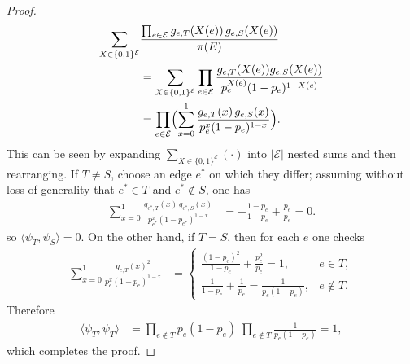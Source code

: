 \documentclass[10pt,a4paper]{amsart}
\begin{document}
\begin{proof}
\begin{align*}
            \sum_{X\in\{0,1\}^{\mathcal E}}&\frac{\prod_{e\in\mathcal{E}}g_{e,T}(X(e))\,g_{e,S}(X(e))}{\pi(E)}\\
            &=\sum_{X\in\{0,1\}^{\mathcal E}} \prod_{e\in\mathcal{E}} \frac{g_{e,T}(X(e)) g_{e,S}(X(e))}{p_e^{X(e)}(1-p_e)^{1-X(e)}}\\
            &=\prod_{e\in\mathcal E}
            \Bigl(\sum_{x=0}^1\frac{g_{e,T}(x)\,g_{e,S}(x)}{p_e^x(1-p_e)^{1-x}}\Bigr).
        \end{align*}
    This can be seen by expanding $\sum_{X\in\{0,1\}^{\mathcal E}}(\cdot)$ into $|\mathcal{E}|$ nested sums and then rearranging. If $T\neq S$, choose an edge $e^\ast$ on which they differ; assuming without loss of generality that $e^\ast\in T$ and $e^\ast\notin S$, one has
        \begin{align*}
            \sum_{x=0}^1\frac{g_{e^\ast,T}(x)\,g_{e^\ast,S}(x)}{p_{e^\ast}^x(1-p_{e^\ast})^{1-x}}
            &=-\frac{1-p_e}{1-p_e} + \frac{p_e}{p_e} = 0.
        \end{align*}
    so $\langle\psi_T,\psi_S\rangle=0$. On the other hand, if $T=S$, then for each $e$ one checks
        \begin{align*}
        \sum_{x=0}^1\frac{g_{e,T}(x)^2}{p_e^x(1-p_e)^{1-x}}
        &=
        \begin{cases}
        \frac{(1-p_e)^2}{1-p_e}+\frac{p_e^2}{p_e}=1,&e\in T,\\
        \frac{1}{1-p_e}+\frac{1}{p_e}=\frac{1}{p_e(1-p_e)},&e\notin T.
        \end{cases}
        \end{align*}
    Therefore
        \begin{align*}
        \langle\psi_T,\psi_T\rangle
        &=\prod_{e\notin T}p_e(1-p_e)
        \;\prod_{e\notin T}\frac1{p_e(1-p_e)}
        =1,
        \end{align*}
    which completes the proof.
\end{proof}
\end{document}
